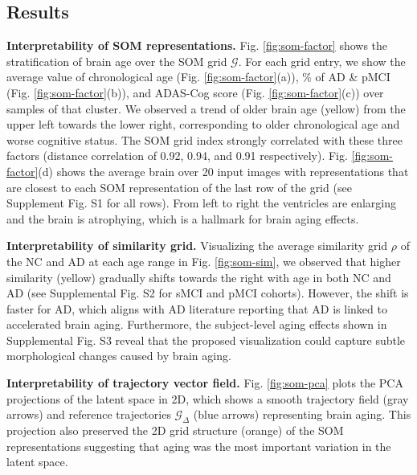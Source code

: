 \documentclass[runningheads]{llncs}
\begin{document}
\subsection{Results}
\noindent\textbf{Interpretability of SOM representations.}
Fig. \ref{fig:som-factor} shows the stratification of brain age over the SOM grid $\mathcal{G}$. For each grid entry, we show the average value of chronological age (Fig. \ref{fig:som-factor}(a)), \% of AD \& pMCI (Fig. \ref{fig:som-factor}(b)), and ADAS-Cog score (Fig. \ref{fig:som-factor}(c)) over samples of that cluster. We observed a trend of older brain age (yellow) from the upper left towards the lower right, corresponding to older chronological age and worse cognitive status. The SOM grid index strongly correlated with these three factors (distance correlation of 0.92, 0.94, and 0.91 respectively). Fig. \ref{fig:som-factor}(d) shows the average brain over 20 input images with representations that are closest to each SOM representation of the last row of the grid (see Supplement Fig. S1 for all rows). From left to right the ventricles are enlarging and the brain is atrophying, which is a hallmark for brain aging effects.

\noindent\textbf{Interpretability of similarity grid.} 
Visualizing the average similarity grid $\rho$ of the  NC and AD at each age range in Fig. \ref{fig:som-sim}, we observed that higher similarity (yellow) gradually shifts towards the right with age in both NC and AD (see Supplemental Fig. S2 for sMCI and pMCI cohorts). However, the shift is faster for AD, which aligns with AD literature reporting that AD is linked to accelerated brain aging\cite{toepper2017dissociating}. Furthermore, the subject-level aging effects shown in Supplemental Fig. S3 reveal that the proposed visualization could capture subtle morphological changes caused by brain aging.

\noindent\textbf{Interpretability of trajectory vector field.} 
Fig. \ref{fig:som-pca} plots the PCA projections of the latent space in 2D, which shows a smooth trajectory field (gray arrows) and reference trajectories $\mathcal{G}_{\Delta}$ (blue arrows) representing brain aging. This projection also preserved the 2D grid structure (orange) of the SOM representations suggesting that aging was the most important variation in the latent space. 
\end{document}
